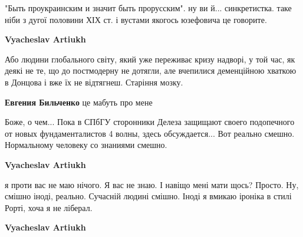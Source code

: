 \begin{itemize}
"Быть проукраинским и значит быть прорусским". ну ви й... синкретистка. таке
ніби з дугої половини ХІХ ст. і вустами якогось юзефовича це говорите.

\begin{itemize}
 
\textbf{Vyacheslav Artiukh} 

Або людини глобального світу, який уже переживає кризу надворі,
у той час, як деякі не те, що до постмодерну не дотягли, але
вчепилися деменційною хваткою в Донцова і вже їх не відтягнеш.
Старіння мозку.

 
\textbf{Евгения Бильченко} це мабуть про мене

 

Боже, о чем... Пока в СПбГУ сторонники Делеза защищают своего подопечного от
новых фундаменталистов 4 волны, здесь обсуждается... Вот реально смешно.
Нормальному человеку со знаниями смешно.


 
\textbf{Vyacheslav Artiukh} 

я проти вас не маю нічого. Я вас не знаю. І навіщо мені мати щось? Просто. Ну,
смішно іноді, реально. Сучасній людині смішно. Іноді я вмикаю іроніка в стилі
Рорті, хоча я не ліберал.

 
\textbf{Vyacheslav Artiukh} 


\end{itemize}
\end{itemize}
